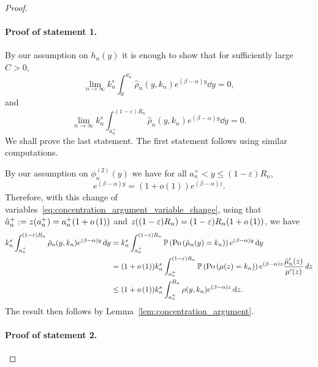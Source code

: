 \begin{proof}
\paragraph{Proof of statement 1.} By our assumption on $h_n(y)$ it is enough to show that for sufficiently large $C > 0$,
\[
	\lim_{n \to \infty} k_n^s \int_0^{a_n^-} \hat{\rho}_n(y,k_n) e^{(\beta-\alpha) y} \dd y = 0,
\]
and
\[
	\lim_{n \to \infty} k_n^s \int_{a_n^+}^{(1-\varepsilon)R_n} \hat{\rho}_n(y,k_n) e^{(\beta-\alpha) y} \dd y = 0.
\]
We shall prove the last statement. The first statement follows using similar computations.

By our assumption on $\phi_n^{(2)}(y)$ we have for all $a_n^+ < y \le (1 - \varepsilon)R_n$,
\begin{equation}
	e^{(\beta-\alpha) y} = (1 + o(1))e^{(\beta-\alpha) z}.
\end{equation}
Therefore, with this change of variables~\eqref{eq:concentration_argument_variable_change}, using that $\hat{a}_n^+ := z(a_n^+) = a_n^+(1 + o\left(1\right))$ and $z((1-\varepsilon)R_n) = (1-\varepsilon)R_n(1+o\left(1\right))$, we have
\begin{align*}
	k_n^s \int_{a_n^+}^{(1-\varepsilon)R_n} \hat{\rho}_n(y,k_n) e^{(\beta - \alpha)y} \operatorname{\mathrm{d}\hspace{-2pt}} y
	&=  k_n^s \int_{a_n^+}^{(1-\varepsilon)R_n} \mathbb{P}\left(\mathrm{Po}\left(\hat{\mu}_n(y) = k_n\right)\right) 
		e^{(\beta-\alpha) y} \operatorname{\mathrm{d}\hspace{-2pt}} y\\
	&= (1 + o\left(1\right))k_n^s\int_{a_n^+}^{(1-\varepsilon)R_n} \mathbb{P}\left(\mathrm{Po}\left(\mu(z) = k_n\right)\right)
		e^{(\beta-\alpha) z} \frac{\hat{\mu}_n^\prime(z)}{\mu^{\prime}(z)} \, dz \\
	&\le (1 + o\left(1\right))k_n^s\int_{a_n^+}^{R_n} \rho(y,k_n)
			e^{(\beta-\alpha) z} \operatorname{\mathrm{d}\hspace{-2pt}} z.
\end{align*}
The result then follows by Lemma~\ref{lem:concentration_argument}.

\paragraph{Proof of statement 2.}


\end{proof}
